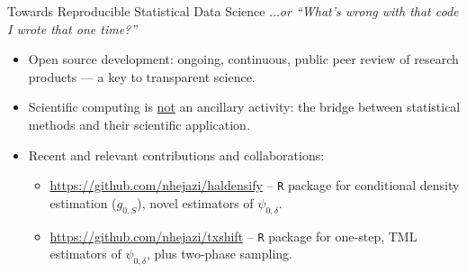 \documentclass{beamer}
\begin{document}



\begin{frame}[c]{Towards Reproducible Statistical Data Science}
\vspace{-0.5em}
\textit{$\ldots$or ``What's wrong with that code I wrote that one time?''}

\begin{center}
\begin{itemize}
  \itemsep6pt
  \item Open source development: ongoing, continuous, public peer review of
    research products --- a key to transparent science.
  \item Scientific computing is \underline{not} an ancillary activity: the
    bridge between statistical methods and their scientific application.
  \item Recent and relevant contributions and collaborations:
    \begin{itemize}
      \itemsep2pt
      \item \url{https://github.com/nhejazi/haldensify} -- \texttt{R} package
        for conditional density estimation ($g_{0,S}$), novel estimators of
        $\psi_{0,\delta}$.
      \item \url{https://github.com/nhejazi/txshift} -- \texttt{R} package for
        one-step, TML estimators of $\psi_{0,\delta}$, plus two-phase sampling.
    \end{itemize}
\end{itemize}
\end{center}

\note{
}

\end{frame}
\end{document}
